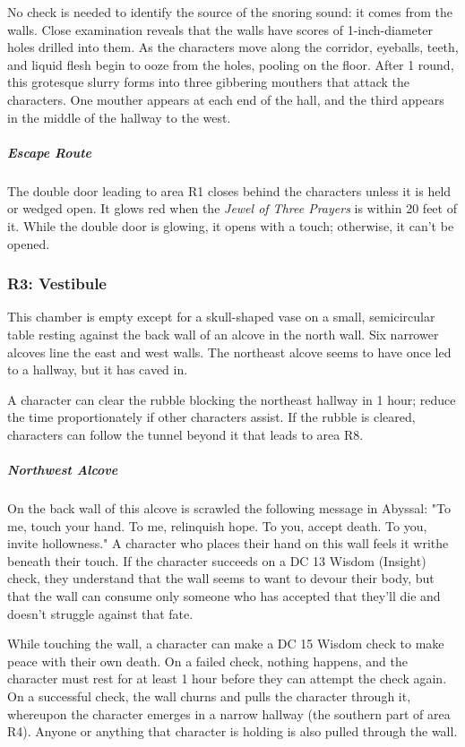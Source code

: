 \documentclass[10pt,a4paper,twoside,bg=print,twocolumn,openany,nodeprecatedcode]{dndbook}
\begin{document}
No check is needed to identify the source of the snoring sound: it comes from the walls. Close examination reveals that the walls have scores of 1-inch-diameter holes drilled into them. As the characters move along the corridor, eyeballs, teeth, and liquid flesh begin to ooze from the holes, pooling on the floor. After 1 round, this grotesque slurry forms into three gibbering mouthers that attack the characters. One mouther appears at each end of the hall, and the third appears in the middle of the hallway to the west.

\subparagraph{Escape Route}
The double door leading to area R1 closes behind the characters unless it is held or wedged open. It glows red when the \textit{Jewel of Three Prayers} is within 20 feet of it. While the double door is glowing, it opens with a touch; otherwise, it can't be opened.

\subsubsection{R3: Vestibule}
\begin{DndReadAloud}{}
This chamber is empty except for a skull-shaped vase on a small, semicircular table resting against the back wall of an alcove in the north wall. Six narrower alcoves line the east and west walls. The northeast alcove seems to have once led to a hallway, but it has caved in.

\end{DndReadAloud}

A character can clear the rubble blocking the northeast hallway in 1 hour; reduce the time proportionately if other characters assist. If the rubble is cleared, characters can follow the tunnel beyond it that leads to area R8.

\subparagraph{Northwest Alcove}
On the back wall of this alcove is scrawled the following message in Abyssal: "To me, touch your hand. To me, relinquish hope. To you, accept death. To you, invite hollowness." A character who places their hand on this wall feels it writhe beneath their touch. If the character succeeds on a DC 13 Wisdom (Insight) check, they understand that the wall seems to want to devour their body, but that the wall can consume only someone who has accepted that they'll die and doesn't struggle against that fate.

While touching the wall, a character can make a DC 15 Wisdom check to make peace with their own death. On a failed check, nothing happens, and the character must rest for at least 1 hour before they can attempt the check again. On a successful check, the wall churns and pulls the character through it, whereupon the character emerges in a narrow hallway (the southern part of area R4). Anyone or anything that character is holding is also pulled through the wall.
\end{document}
